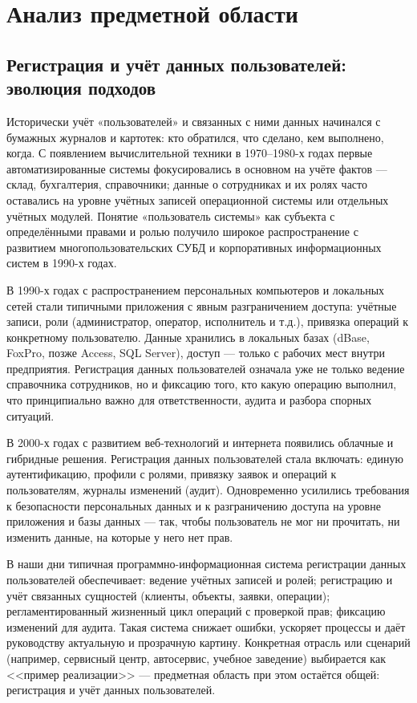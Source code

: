 \section{Анализ предметной области}
\subsection{Регистрация и учёт данных пользователей: эволюция подходов}

Исторически учёт «пользователей» и связанных с ними данных начинался с бумажных журналов и картотек: кто обратился, что сделано, кем выполнено, когда. С появлением вычислительной техники в 1970–1980-х годах первые автоматизированные системы фокусировались в основном на учёте фактов — склад, бухгалтерия, справочники; данные о сотрудниках и их ролях часто оставались на уровне учётных записей операционной системы или отдельных учётных модулей. Понятие «пользователь системы» как субъекта с определёнными правами и ролью получило широкое распространение с развитием многопользовательских СУБД и корпоративных информационных систем в 1990-х годах.

В 1990-х годах с распространением персональных компьютеров и локальных сетей стали типичными приложения с явным разграничением доступа: учётные записи, роли (администратор, оператор, исполнитель и т.д.), привязка операций к конкретному пользователю. Данные хранились в локальных базах (dBase, FoxPro, позже Access, SQL Server), доступ — только с рабочих мест внутри предприятия. Регистрация данных пользователей означала уже не только ведение справочника сотрудников, но и фиксацию того, кто какую операцию выполнил, что принципиально важно для ответственности, аудита и разбора спорных ситуаций.

В 2000-х годах с развитием веб-технологий и интернета появились облачные и гибридные решения. Регистрация данных пользователей стала включать: единую аутентификацию, профили с ролями, привязку заявок и операций к пользователям, журналы изменений (аудит). Одновременно усилились требования к безопасности персональных данных и к разграничению доступа на уровне приложения и базы данных — так, чтобы пользователь не мог ни прочитать, ни изменить данные, на которые у него нет прав.

В наши дни типичная программно-информационная система регистрации данных пользователей обеспечивает: ведение учётных записей и ролей; регистрацию и учёт связанных сущностей (клиенты, объекты, заявки, операции); регламентированный жизненный цикл операций с проверкой прав; фиксацию изменений для аудита. Такая система снижает ошибки, ускоряет процессы и даёт руководству актуальную и прозрачную картину. Конкретная отрасль или сценарий (например, сервисный центр, автосервис, учебное заведение) выбирается как <<пример реализации>> — предметная область при этом остаётся общей: регистрация и учёт данных пользователей.

